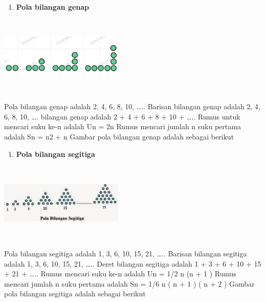 \documentclass[11pt,fleqn]{book} %
\begin{document}
\noindent
\begin{enumerate}
	\item  \textbf{ Pola bilangan genap}
\end{enumerate}
\noindent
\begin{center}
	\noindent \includegraphics*[width=2.32in, height=1.48in, keepaspectratio=false, trim=0.00in 0.11in 0.00in 0.00in]{Pictures/22.PNG}
\end{center}

\noindent
\noindent Pola bilangan genap adalah 2, 4, 6, 8, 10, …..
\noindent Barisan bilangan genap adalah 2, 4, 6, 8, 10, ….
\noindent bilangan genap adalah 2 + 4 + 6 + 8 + 10 + …..
\noindent Rumus untuk mencari suku ke-n adalah Un = 2n
\noindent Rumus mencari jumlah n suku pertama adalah Sn = n2 + n
\noindent Gambar pola bilangan genap adalah sebagai berikut
\begin{enumerate}
	\item  \textbf{  Pola bilangan segitiga}
\end{enumerate}
\noindent
\begin{center}
	\noindent \includegraphics*[width=2.32in, height=1.48in, keepaspectratio=false, trim=0.00in 0.11in 0.00in 0.00in]{Pictures/23.JPG}
\end{center}
\noindent
\noindent Pola bilangan segitiga adalah 1, 3, 6, 10, 15, 21, …..
\noindent Barisan bilangan segitiga adalah 1, 3, 6, 10, 15, 21, …..
\noindent Deret bilangan segitiga adalah 1 + 3 + 6 + 10 + 15 + 21 + …..
\noindent Rumus mencari suku ke-n adalah Un = 1/2 n (n + 1 )
\noindent Rumus mencari jumlah n suku pertama adalah Sn = 1/6 n ( n + 1 ) ( n + 2 )
\noindent Gambar pola bilangan segitiga adalah sebagai berikut
\end{document}
